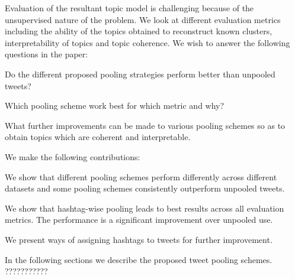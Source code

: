 \documentclass[10pt,a5paper,twoside]{article}
\begin{document}
Evaluation of the resultant topic model is challenging because of the unsupervised nature of the problem. We look at different evaluation metrics 
including the ability of the topics obtained to reconstruct known clusters, 
interpretability of topics and topic coherence. We wish to answer the following questions in the paper:
\begin{compactitem}
\item Do the different proposed pooling strategies perform better than unpooled tweets?
\item Which pooling scheme work best for which metric and why?
\item What further improvements can be made to various pooling schemes so as to obtain topics which are coherent and interpretable.
\end{compactitem}
We make the following contributions:
\begin{compactitem}
\item We show that different pooling schemes perform differently across different datasets and some pooling schemes consistently outperform unpooled tweets.
\item We show that hashtag-wise pooling leads to best results across all evaluation metrics.  The performance is a significant improvement over unpooled use.
\item We present ways of assigning hashtags to tweets for further improvement.
\end{compactitem}

In the following sections we describe the proposed tweet pooling schemes.
???????????
\end{document}
